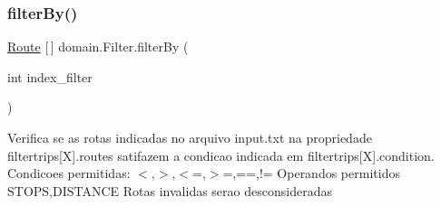 \subsubsection{\texorpdfstring{filter\+By()}{filterBy()}}
{\footnotesize\ttfamily \hyperlink{classdomain_1_1_route}{Route} \mbox{[}$\,$\mbox{]} domain.\+Filter.\+filter\+By (\begin{DoxyParamCaption}\item[{int}]{index\+\_\+filter }\end{DoxyParamCaption})}

Verifica se as rotas indicadas no arquivo \textquotesingle{}input.\+txt\textquotesingle{} na propriedade \textquotesingle{}filtertrips\mbox{[}X\mbox{]}.routes\textquotesingle{} satifazem a condicao indicada em \textquotesingle{}filtertrips\mbox{[}X\mbox{]}.condition\textquotesingle{}. Condicoes permitidas\+: \textquotesingle{}$<$\textquotesingle{},\textquotesingle{}$>$\textquotesingle{},\textquotesingle{}$<$=\textquotesingle{},\textquotesingle{}$>$=\textquotesingle{},\textquotesingle{}==\textquotesingle{},\textquotesingle{}!=\textquotesingle{} Operandos permitidos S\+T\+O\+PS,D\+I\+S\+T\+A\+N\+CE Rotas invalidas serao desconsideradas


